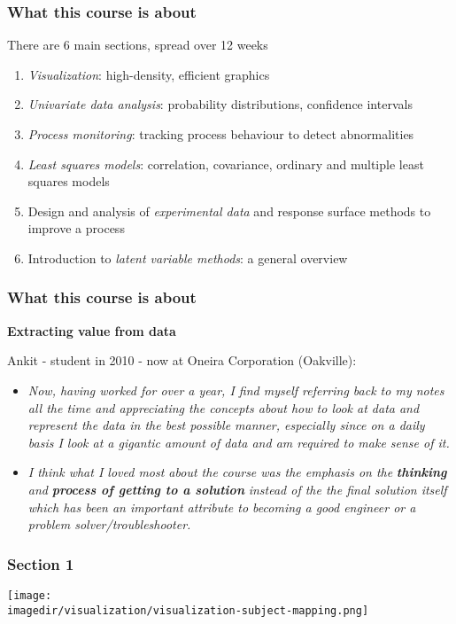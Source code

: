 \begin{frame}\frametitle{What this course is about}
	
	There are 6 main sections, spread over 12 weeks
	\begin{enumerate}
		\item	\emph{Visualization}: high-density, efficient graphics 
		\item	\emph{Univariate data analysis}: probability distributions, confidence intervals 
		\item	\emph{Process monitoring}: tracking process behaviour to detect abnormalities 
		\item	\emph{Least squares models}: correlation, covariance, ordinary and multiple least squares models 
		\item	Design and analysis of \emph{experimental data} and response surface methods to improve a process 
		\item	Introduction to \emph{latent variable methods}: a general overview 
	\end{enumerate}
\end{frame}

\begin{frame}\frametitle{What this course is about}
	
	\textbf{Extracting value from data}
	
	Ankit - student in 2010 - now at Oneira Corporation (Oakville):
	\begin{itemize}
		\item	\emph{Now, having worked for over a year, I find myself referring back to my notes all the time and appreciating the concepts about how to look at data and represent the data in the best possible manner, especially since on a daily basis I look at a gigantic amount of data and am required to make sense of it.} 
	\end{itemize}
	\begin{itemize}
		\item	\emph{I think what I loved most about the course was the emphasis on the} \textbf{\emph{thinking}} \emph{and} \textbf{\emph{process of getting to a solution}} \emph{instead of the the final solution itself which has been an important attribute to becoming a good engineer or a problem solver/troubleshooter.} 
	\end{itemize}
\end{frame}

\begin{frame}\frametitle{Section 1}
	
	\texttt{[image: \\imagedir/visualization/visualization-subject-mapping.png]}
\end{frame}

